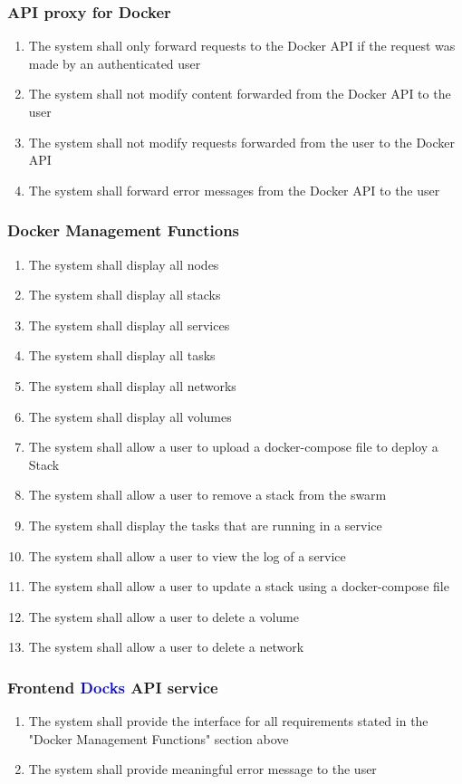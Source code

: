 \documentclass[]{article}
\newcommand{\docks}{\textcolor{Blue}{Docks} }
\newcommand{\docker}{Docker }
\begin{document}
\subsubsection{API proxy for Docker}
\begin{enumerate}[label*=R4.\arabic*]
	\item The system shall only forward requests to the \docker API if the request was made by an authenticated user
	\item The system shall not modify content forwarded from the \docker API to the user
	\item The system shall not modify requests forwarded from the user to the \docker API
	\item The system shall forward error messages from the \docker API to the user
\end{enumerate}

\subsubsection{Docker Management Functions}
\begin{enumerate}[label*=R5.\arabic*.]
	\item The system shall display all nodes
	\item The system shall display all stacks
	\item The system shall display all services
	\item The system shall display all tasks
	\item The system shall display all networks
	\item The system shall display all volumes
	\item The system shall allow a user to upload a docker-compose file to deploy a Stack
	\item The system shall allow a user to remove a stack from the swarm
	\item The system shall display the tasks that are running in a service
	\item The system shall allow a user to view the log of a service
	\item The system shall allow a user to update a stack using a docker-compose file
	\item The system shall allow a user to delete a volume
	\item The system shall allow a user to delete a network
\end{enumerate}

\subsubsection{Frontend \docks API service}
\begin{enumerate}[label*=R6.\arabic*.]
	\item The system shall provide the interface for all requirements stated in the "Docker Management Functions" section above
	\item The system shall provide meaningful error message to the user
\end{enumerate}
\end{document}
